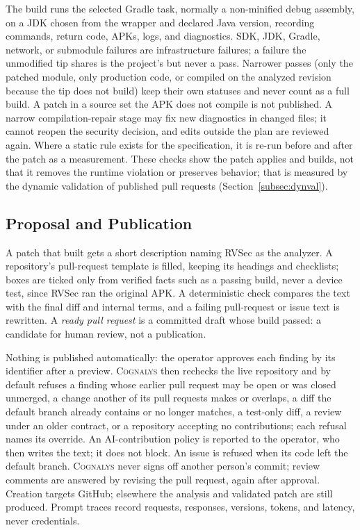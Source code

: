 \documentclass[conference]{IEEEtran}
\newcommand{\system}{\textsc{Cognalys}}
\begin{document}
The build runs the selected Gradle task, normally a non-minified debug
assembly, on a JDK chosen from the wrapper and declared Java version, recording
commands, return code, APKs, logs, and diagnostics. SDK, JDK, Gradle, network,
or submodule failures are infrastructure failures; a failure the unmodified tip
shares is the project's but never a pass. Narrower passes (only the patched
module, only production code, or compiled on the analyzed revision because the
tip does not build) keep their own statuses and never count as a full build. A
patch in a source set the APK does not compile is not published. A narrow
compilation-repair stage may fix new diagnostics in changed files; it cannot
reopen the security decision, and edits outside the plan are reviewed again.
Where a static rule exists for the specification, it is re-run before and after
the patch as a measurement. These checks show the patch applies and builds, not
that it removes the runtime violation or preserves behavior; that is measured
by the dynamic validation of published pull requests
(Section~\ref{subsec:dynval}).

\subsection{Proposal and Publication}

A patch that built gets a short description naming RVSec as the analyzer. A
repository's pull-request template is filled, keeping its headings and
checklists; boxes are ticked only from verified facts such as a passing build,
never a device test, since RVSec ran the original APK. A deterministic check
compares the text with the final diff and internal terms, and a failing
pull-request or issue text is rewritten. A \emph{ready pull request} is a committed
draft whose build passed: a candidate for human review, not a publication.

Nothing is published automatically: the operator approves each finding by its
identifier after a preview. \system{} then rechecks the live repository and by
default refuses a finding whose earlier pull request may be open or was closed
unmerged, a change another of its pull requests makes or overlaps, a diff the
default branch already contains or no longer matches, a test-only diff, a
review under an older contract, or a repository accepting no contributions;
each refusal names its override. An AI-contribution policy is reported to the
operator, who then writes the text; it does not block. An issue is refused when
its code left the default branch. \system{} never signs off another person's
commit; review comments are answered by revising the pull request, again after
approval. Creation targets GitHub; elsewhere the analysis and validated patch
are still produced. Prompt traces record requests, responses, versions, tokens,
and latency, never credentials.
\end{document}
